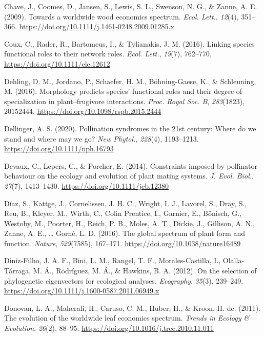 \documentclass[
  12pt,
  a4paper,
]{article}
\newlength{\cslhangindent}
\newlength{\cslentryspacingunit} %
\newenvironment{CSLReferences}[2] %
 {%
  \setlength{\parindent}{0pt}
  \ifodd #1
  \let\oldpar\par
  \def\par{\hangindent=\cslhangindent\oldpar}
  \fi
  \setlength{\parskip}{#2\cslentryspacingunit}
 }%
 {}
\begin{document}
\begin{CSLReferences}{1}{0}
\leavevmode{}%
Chave, J., Coomes, D., Jansen, S., Lewis, S. L., Swenson, N. G., \& Zanne, A. E. (2009). Towards a worldwide wood economics spectrum. \emph{Ecol. Lett.}, \emph{12}(4), 351--366. \url{https://doi.org/10.1111/j.1461-0248.2009.01285.x}

\leavevmode{}%
Coux, C., Rader, R., Bartomeus, I., \& Tylianakis, J. M. (2016). Linking species functional roles to their network roles. \emph{Ecol. Lett.}, \emph{19}(7), 762--770. \url{https://doi.org/10.1111/ele.12612}

\leavevmode{}%
Dehling, D. M., Jordano, P., Schaefer, H. M., Böhning-Gaese, K., \& Schleuning, M. (2016). Morphology predicts species' functional roles and their degree of specialization in plant--frugivore interactions. \emph{Proc. Royal Soc. B}, \emph{283}(1823), 20152444. \url{https://doi.org/10.1098/rspb.2015.2444}

\leavevmode{}%
Dellinger, A. S. (2020). Pollination syndromes in the 21st century: Where do we stand and where may we go? \emph{New Phytol.}, \emph{228}(4), 1193--1213. \url{https://doi.org/10.1111/nph.16793}

\leavevmode{}%
Devaux, C., Lepers, C., \& Porcher, E. (2014). Constraints imposed by pollinator behaviour on the ecology and evolution of plant mating systems. \emph{J. Evol. Biol.}, \emph{27}(7), 1413--1430. \url{https://doi.org/10.1111/jeb.12380}

\leavevmode{}%
Díaz, S., Kattge, J., Cornelissen, J. H. C., Wright, I. J., Lavorel, S., Dray, S., Reu, B., Kleyer, M., Wirth, C., Colin Prentice, I., Garnier, E., Bönisch, G., Westoby, M., Poorter, H., Reich, P. B., Moles, A. T., Dickie, J., Gillison, A. N., Zanne, A. E., \ldots{} Gorné, L. D. (2016). The global spectrum of plant form and function. \emph{Nature}, \emph{529}(7585), 167--171. \url{https://doi.org/10.1038/nature16489}

\leavevmode{}%
Diniz-Filho, J. A. F., Bini, L. M., Rangel, T. F., Morales-Castilla, I., Olalla-Tárraga, M. Á., Rodríguez, M. Á., \& Hawkins, B. A. (2012). On the selection of phylogenetic eigenvectors for ecological analyses. \emph{Ecography}, \emph{35}(3), 239--249. \url{https://doi.org/10.1111/j.1600-0587.2011.06949.x}

\leavevmode{}%
Donovan, L. A., Maherali, H., Caruso, C. M., Huber, H., \& Kroon, H. de. (2011). The evolution of the worldwide leaf economics spectrum. \emph{Trends in Ecology \& Evolution}, \emph{26}(2), 88--95. \url{https://doi.org/10.1016/j.tree.2010.11.011}


\end{CSLReferences}
\end{document}
